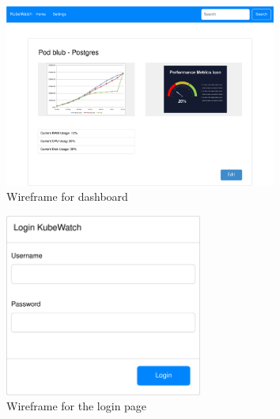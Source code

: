 \begin{figure}[h]
  \centering
  \caption{\label{fig:wireframe-dashboard}Wireframe for dashboard}
  \includegraphics[height=6cm]{resources/wireframe_kubewatch-Dashboard.png}
\end{figure}

\begin{figure}[h]
  \centering
  \caption{\label{fig:wireframe-login}Wireframe for the login page}
  \includegraphics[height=6cm]{resources/wireframe_kubewatch-Login.png}
\end{figure}